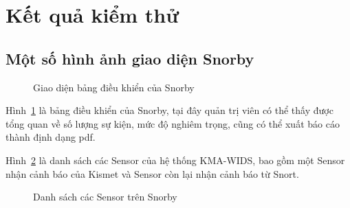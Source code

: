 \section{Kết quả kiểm thử}
\subsection{Một số hình ảnh giao diện Snorby}

\begin{figure}[H]
    \centering
    \caption{
        \label{fig:snorby-dashboard}
        Giao diện bảng điều khiển của Snorby}
\end{figure}

Hình~\ref{fig:snorby-dashboard} là bảng điều khiển của Snorby, tại đây quản trị viên có thể thấy được tổng quan về số lượng sự kiện, mức độ nghiêm trọng, cũng có thể xuất báo cáo thành định dạng pdf.

Hình~\ref{fig:snorby-sensors} là danh sách các Sensor của hệ thống KMA-WIDS, bao gồm một Sensor nhận cảnh báo của Kismet và Sensor còn lại nhận cảnh báo từ Snort.

\begin{figure}[H]
    \centering
    \caption{
        \label{fig:snorby-sensors}
        Danh sách các Sensor trên Snorby}
\end{figure}

